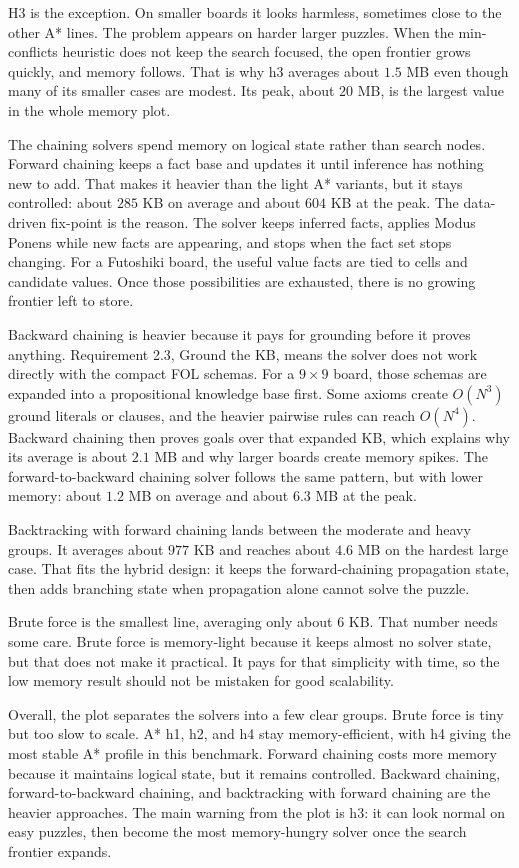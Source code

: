 H3 is the exception. On smaller boards it looks harmless, sometimes close to the
other A* lines. The problem appears on harder larger puzzles. When the
min-conflicts heuristic does not keep the search focused, the open frontier
grows quickly, and memory follows. That is why h3 averages about \(1.5\) MB
even though many of its smaller cases are modest. Its peak, about \(20\) MB, is
the largest value in the whole memory plot.

The chaining solvers spend memory on logical state rather than search nodes.
Forward chaining keeps a fact base and updates it until inference has nothing
new to add. That makes it heavier than the light A* variants, but it stays
controlled: about \(285\) KB on average and about \(604\) KB at the peak. The
data-driven fix-point is the reason. The solver keeps inferred facts, applies
Modus Ponens while new facts are appearing, and stops when the fact set stops
changing. For a Futoshiki board, the useful value facts are tied to cells and
candidate values. Once those possibilities are exhausted, there is no growing
frontier left to store.

Backward chaining is heavier because it pays for grounding before it proves
anything. Requirement 2.3, Ground the KB, means the solver does not work
directly with the compact FOL schemas. For a \(9 \times 9\) board, those schemas
are expanded into a propositional knowledge base first. Some axioms create
\(O(N^3)\) ground literals or clauses, and the heavier pairwise rules can reach
\(O(N^4)\). Backward chaining then proves goals over that expanded KB, which
explains why its average is about \(2.1\) MB and why larger boards create memory
spikes. The forward-to-backward chaining solver follows the same pattern, but
with lower memory: about \(1.2\) MB on average and about \(6.3\) MB at the peak.

Backtracking with forward chaining lands between the moderate and heavy groups.
It averages about \(977\) KB and reaches about \(4.6\) MB on the hardest large
case. That fits the hybrid design: it keeps the forward-chaining propagation
state, then adds branching state when propagation alone cannot solve the puzzle.

Brute force is the smallest line, averaging only about \(6\) KB. That number
needs some care. Brute force is memory-light because it keeps almost no solver
state, but that does not make it practical. It pays for that simplicity with
time, so the low memory result should not be mistaken for good scalability.

Overall, the plot separates the solvers into a few clear groups. Brute force is
tiny but too slow to scale. A* h1, h2, and h4 stay memory-efficient, with h4
giving the most stable A* profile in this benchmark. Forward chaining costs more
memory because it maintains logical state, but it remains controlled. Backward
chaining, forward-to-backward chaining, and backtracking with forward chaining
are the heavier approaches. The main warning from the plot is h3: it can look
normal on easy puzzles, then become the most memory-hungry solver once the
search frontier expands.
